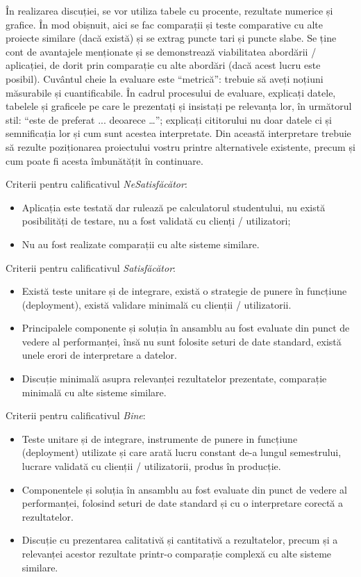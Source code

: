 În realizarea discuției, se vor utiliza tabele cu procente, rezultate numerice și grafice. În mod obișnuit, aici se fac comparații și teste comparative cu alte proiecte similare (dacă există) și se extrag puncte tari și puncte slabe. Se ține cont de avantajele menționate și se demonstrează viabilitatea abordării / aplicației, de dorit prin comparație cu alte abordări (dacă acest lucru este posibil). Cuvântul cheie la evaluare este ``metrică'': trebuie să aveți noțiuni măsurabile și cuantificabile. În cadrul procesului de evaluare, explicați datele, tabelele și graficele pe care le prezentați și insistați pe relevanța lor, în următorul stil: ``este de preferat ... deoarece …''; explicați cititorului nu doar datele ci și semnificația lor și cum sunt acestea interpretate. Din această interpretare trebuie să rezulte poziționarea proiectului vostru printre alternativele existente, precum și cum poate fi acesta îmbunătățit în continuare.

Criterii pentru calificativul \textit{Ne\textit{Satisfăcător}}: 
\begin{itemize}
	\item Aplicația este testată dar rulează pe calculatorul studentului, nu există posibilități de testare, nu a fost validată cu clienți / utilizatori;
	\item Nu au fost realizate comparații cu alte sisteme similare.
\end{itemize}

Criterii pentru calificativul \textit{Satisfăcător}: 
\begin{itemize}
	\item \dezvoltare  Există teste unitare și de integrare, există o strategie de punere în funcțiune (deployment), există validare minimală cu clienții / utilizatorii.
	\item \cercetare Principalele componente și soluția în ansamblu au fost evaluate din punct de vedere al performanței, însă nu sunt folosite seturi de date standard, există unele erori de interpretare a datelor.
	\item \ambele Discuție minimală asupra relevanței rezultatelor prezentate, comparație minimală cu alte sisteme similare.
\end{itemize}

Criterii pentru calificativul \textit{Bine}: 
\begin{itemize}
	\item \dezvoltare Teste unitare și de integrare, instrumente de punere in funcțiune (deployment) utilizate și care arată lucru constant de-a lungul semestrului, lucrare validată cu clienții / utilizatorii, produs în producție.
	\item \cercetare Componentele și soluția în ansamblu au fost evaluate din punct de vedere al performanței, folosind seturi de date standard și cu o interpretare corectă a rezultatelor.
	\item \ambele Discuție cu prezentarea calitativă și cantitativă a rezultatelor, precum și a relevanței acestor rezultate printr-o comparație complexă cu alte sisteme similare.
\end{itemize}

